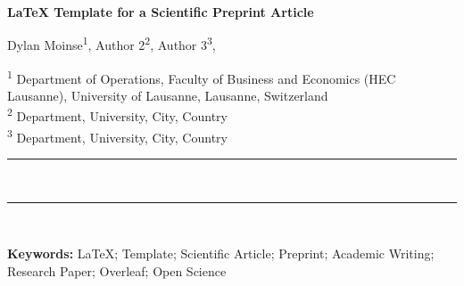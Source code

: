 \documentclass[../main.tex]{subfiles}
\begin{document}


\begin{titlepage}
    \thispagestyle{plain} %
    \topskip=0pt
    \centering

    {\Large \bfseries LaTeX Template for a Scientific Preprint Article
    \\[0.8cm]} %

    \begin{flushleft} %
    {\small
    Dylan Moinse\textsuperscript{1},
    Author 2\textsuperscript{2},
    Author 3\textsuperscript{3},
    \\[0.3cm]} %

    {\scriptsize
    \textsuperscript{1} Department of Operations, Faculty of Business and Economics (HEC Lausanne), University of Lausanne, Lausanne, Switzerland %
    \\
    \textsuperscript{2} Department, University, City, Country %
    \\
    \textsuperscript{3} Department, University, City, Country %
    \\[1cm]}
    
    \end{flushleft}
    
    \rule{\textwidth}{0.1pt}
    \\[0.4cm]
    \begin{abstract}
        \noindent
        \scriptsize{
        \lipsum[1-3]
        }
    \end{abstract}
    \rule{\textwidth}{0.1pt}
    \\[0.6cm]

    \begin{flushleft} %
    \textbf{Keywords:}
    LaTeX;
    Template;
    Scientific Article;
    Preprint;
    Academic Writing;
    Research Paper;
    Overleaf;
    Open Science
    \end{flushleft}



\end{titlepage}

\setcounter{page}{1} %
\pagestyle{fancy} %

    
\end{document}

